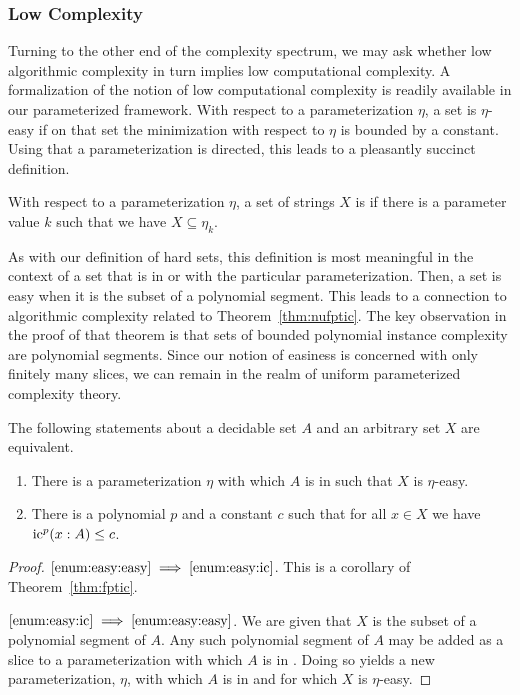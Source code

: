 \subsubsection{Low Complexity}
Turning to the other end of the complexity spectrum, we may ask whether low algorithmic complexity in turn implies low computational complexity.
A formalization of the notion of low computational complexity is readily available in our parameterized framework.
With respect to a parameterization $\eta$, a set is $\eta$-easy if on that set the minimization with respect to $\eta$ is bounded by a constant.
Using that a parameterization is directed, this leads to a pleasantly succinct definition.
\begin{definition}
  With respect to a parameterization $\eta$, a set of strings $X$ is  if there is a parameter value $k$ such that we have $X \subseteq \eta_k$.
\end{definition}
As with our definition of hard sets, this definition is most meaningful in the context of a set that is in  or  with the particular parameterization.
Then, a set is easy when it is the subset of a polynomial segment.
This leads to a connection to algorithmic complexity related to Theorem~\ref{thm:nufptic}.
The key observation in the proof of that theorem is that sets of bounded polynomial instance complexity are polynomial segments.
Since our notion of easiness is concerned with only finitely many slices, we can remain in the realm of uniform parameterized complexity theory.
\begin{theorem}
  The following statements about a decidable set $A$ and an arbitrary set $X$ are equivalent.
  \begin{enumerate}
  \item\label{enum:easy:easy}
    There is a parameterization $\eta$ with which $A$ is in  such that $X$ is $\eta$-easy.
  \item\label{enum:easy:ic}
    There is a polynomial $p$ and a constant $c$ such that for all $x \in X$ we have $\operatorname{ic}^p(x : A) \le c$.
  \end{enumerate}
\end{theorem}
\begin{proof}
$\ref{enum:easy:easy} \implies \ref{enum:easy:ic}$.
  This is a corollary of Theorem~\ref{thm:fptic}.

$\ref{enum:easy:ic} \implies \ref{enum:easy:easy}$.
  We are given that $X$ is the subset of a polynomial segment of $A$.
  Any such polynomial segment of $A$ may be added as a slice to a parameterization with which $A$ is in .
  Doing so yields a new parameterization, $\eta$, with which $A$ is in  and for which $X$ is $\eta$-easy.
\end{proof}

